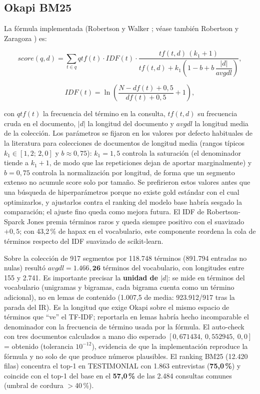 \documentclass[11pt]{tg_usta}
\begin{document}
\subsection{Okapi BM25}

La fórmula implementada (Robertson y Walker \cite{robertson1994simple}; véase también Robertson y Zaragoza \cite{robertson2009probabilistic}) es:

\begin{equation}\label{eq:bm25}
score(q,d) = \sum_{t\in q} qtf(t)\cdot IDF(t)\cdot
\frac{tf(t,d)\,(k_1+1)}{tf(t,d)+k_1\!\left(1-b+b\,\dfrac{|d|}{avgdl}\right)},
\end{equation}

\begin{equation}\label{eq:bm25idf}
IDF(t) = \ln\!\left(\frac{N-df(t)+0{,}5}{df(t)+0{,}5}+1\right),
\end{equation}

\noindent con $qtf(t)$ la frecuencia del término en la consulta, $tf(t,d)$ su frecuencia cruda en el documento, $|d|$ la longitud del documento y $avgdl$ la longitud media de la colección. Los parámetros se fijaron en los valores por defecto habituales de la literatura para colecciones de documentos de longitud media (rangos típicos $k_1\in[1{,}2;\,2{,}0]$ y $b\approx 0{,}75$): $k_1=1{,}5$ controla la saturación (el denominador tiende a $k_1+1$, de modo que las repeticiones dejan de aportar marginalmente) y $b=0{,}75$ controla la normalización por longitud, de forma que un segmento extenso no acumule score solo por tamaño. Se prefirieron estos valores antes que una búsqueda de hiperparámetros porque no existe gold estándar con el cual optimizarlos, y ajustarlos contra el ranking del modelo base habría sesgado la comparación; el ajuste fino queda como mejora futura. El IDF de Robertson-Sparck Jones premia términos raros y queda siempre positivo con el suavizado $+0{,}5$; con 43,2\,\% de hapax en el vocabulario, este componente reordena la cola de términos respecto del IDF suavizado de scikit-learn.

Sobre la colección de 917 segmentos por 118.748 términos (891.794 entradas no nulas) resultó $avgdl=\mathbf{1.466{,}26}$ términos del vocabulario, con longitudes entre 155 y 2.741. Es importante precisar la \textbf{unidad de $|d|$}: se mide en términos del vocabulario (unigramas y bigramas, cada bigrama cuenta como un término adicional), no en lemas de contenido (1.007,5 de media: 923.912/917 tras la parada del IR). Es la longitud que exige Okapi sobre el mismo espacio de términos que ``ve'' el TF-IDF; reportarla en lemas habría hecho incomparable el denominador con la frecuencia de término usada por la fórmula. El auto-check con tres documentos calculados a mano dio esperado $[0{,}671434,\ 0{,}552945,\ 0{,}0]$ = obtenido (tolerancia $10^{-12}$), evidencia de que la implementación reproduce la fórmula y no solo de que produce números plausibles. El ranking BM25 (12.420 filas) concentra el top-1 en TESTIMONIAL con 1.863 entrevistas (\textbf{75,0\,\%}) y coincide con el top-1 del base en el \textbf{57,0\,\%} de las 2.484 consultas comunes (umbral de cordura $>$40\,\%).
\end{document}
